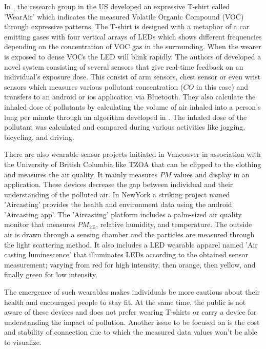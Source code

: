 In \cite{Kim2010}, the research group in the US developed an expressive T-shirt called 'WearAir' which indicates the measured Volatile Organic Compound (VOC) through expressive patterns. The T-shirt is designed with a metaphor of a car emitting gases with four vertical arrays of LEDs which shows different frequencies depending on the concentration of VOC gas in the surrounding. When the wearer is exposed to dense VOCs the LED will blink rapidly. 
The authors of \cite{Hu2014} developed a novel system consisting of several sensors that give real-time feedback on an individual's exposure dose. This consist of arm sensors, chest sensor or even wrist sensors which measures various pollutant concentration ($CO$ in this case) and transfers to an android or ios application via Bluetooth. They also calculate the inhaled dose of pollutants by calculating the volume of air inhaled into a person's lung per minute through an algorithm developed in \cite{Valli2013}. The inhaled dose of the pollutant was calculated and compared during various activities like jogging, bicycling, and driving.

 There are also wearable sensor projects initiated in Vancouver in association with the University of British Columbia like TZOA \cite{tzoa} that can be clipped to the clothing and measures the air quality. It mainly measures $PM$ values and display in an application. These devices decrease the gap between individual and their understanding of the polluted air. In NewYork a striking project named 'Aircasting'\cite{aircasting} provides the health and environment data using the android 'Aircasting app'. The 'Aircasting'\cite{Han2010} platform includes a palm-sized air quality monitor that measures $PM_{2.5}$, relative humidity, and temperature. The outside air is drawn through a sensing chamber and the particles are measured through the light scattering method. It also includes a LED wearable apparel named 'Air casting luminescence'\cite{Luminescence} that illuminates LEDs according to the obtained sensor measurement; varying from red for high intensity, then orange, then yellow, and finally green for low intensity. 
 
 The emergence of such wearables makes individuals be more cautious about their health and encouraged people to stay fit. At the same time, the public is not aware of these devices and does not prefer wearing T-shirts or carry a device for understanding the impact of pollution. Another issue to be focused on is the cost and stability of connection due to which the measured data values won't be able to visualize.



